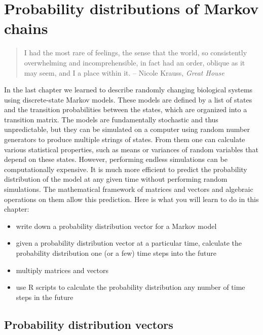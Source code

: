 \documentclass[
]{book}
\providecommand{\tightlist}{%
  \setlength{\itemsep}{0pt}\setlength{\parskip}{0pt}}
\theoremstyle{definition}
\theoremstyle{definition}
\theoremstyle{definition}
\theoremstyle{remark}
\begin{document}
\hypertarget{probability-distributions-of-markov-chains}{%
\chapter{Probability distributions of Markov chains}\label{probability-distributions-of-markov-chains}}

\begin{quote}
I had the most rare of feelings, the sense that the world, so consistently overwhelming and incomprehensible, in fact had an order, oblique as it may seem, and I a place within it.
-- Nicole Krauss, \emph{Great House}
\end{quote}

In the last chapter we learned to describe randomly changing biological systems using discrete-state Markov models. These models are defined by a list of states and the transition probabilities between the states, which are organized into a transition matrix. The models are fundamentally stochastic and thus unpredictable, but they can be simulated on a computer using random number generators to produce multiple strings of states. From them one can calculate various statistical properties, such as means or variances of random variables that depend on these states. However, performing endless simulations can be computationally expensive. It is much more efficient to predict the probability distribution of the model at any given time without performing random simulations. The mathematical framework of matrices and vectors and algebraic operations on them allow this prediction. Here is what you will learn to do in this chapter:

\begin{itemize}
\tightlist
\item
  write down a probability distribution vector for a Markov model
\item
  given a probability distribution vector at a particular time, calculate the probability distribution one (or a few) time steps into the future
\item
  multiply matrices and vectors
\item
  use R scripts to calculate the probability distribution any number of time steps in the future
\end{itemize}

\hypertarget{probability-distribution-vectors}{%
\section{Probability distribution vectors}\label{probability-distribution-vectors}}
\end{document}
